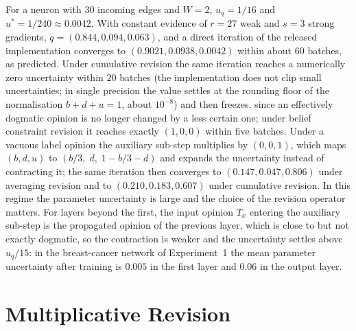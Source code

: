 \begin{remark}\label{rem:worked}
For a neuron with $30$ incoming edges and $W = 2$, $u_q = 1/16$ and $u^* = 1/240 \approx 0.0042$. With constant evidence of $r = 27$ weak and $s = 3$ strong gradients, $q = (0.844, 0.094, 0.063)$, and a direct iteration of the released implementation converges to $(0.9021, 0.0938, 0.0042)$ within about $60$ batches, as predicted. Under cumulative revision the same iteration reaches a numerically zero uncertainty within $20$ batches (the implementation does not clip small uncertainties; in single precision the value settles at the rounding floor of the normalisation $b + d + u = 1$, about $10^{-8}$) and then freezes, since an effectively dogmatic opinion is no longer changed by a less certain one; under belief constraint revision it reaches exactly $(1, 0, 0)$ within five batches. Under a vacuous label opinion the auxiliary sub-step multiplies by $(0, 0, 1)$, which maps $(b, d, u)$ to $(b/3,\; d,\; 1 - b/3 - d)$ and expands the uncertainty instead of contracting it; the same iteration then converges to $(0.147, 0.047, 0.806)$ under averaging revision and to $(0.210, 0.183, 0.607)$ under cumulative revision. In this regime the parameter uncertainty is large and the choice of the revision operator matters. For layers beyond the first, the input opinion $T_x$ entering the auxiliary sub-step is the propagated opinion of the previous layer, which is close to but not exactly dogmatic, so the contraction is weaker and the uncertainty settles above $u_q/15$: in the breast-cancer network of Experiment~1 the mean parameter uncertainty after training is $0.005$ in the first layer and $0.06$ in the output layer.
\end{remark}

\section{Multiplicative Revision}

